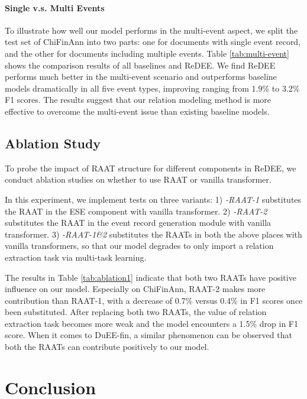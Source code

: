 \documentclass[11pt]{article}
\begin{document}
\paragraph{Single v.s. Multi Events} To illustrate how well our model performs in the multi-event aspect, we split the test set of ChiFinAnn into two parts: one for documents with single event record, and the other for documents including multiple events. Table \ref{tab:multi-event} shows the comparison results of all baselines and ReDEE. We find ReDEE performs much better in the multi-event scenario and outperforms baseline models dramatically in all five event types, improving ranging from 1.9\% to 3.2\% F1 scores. The results suggest that our relation modeling method is more effective to overcome the multi-event issue than existing baseline models.

\subsection{Ablation Study}

To probe the impact of RAAT structure for different components in ReDEE, we conduct ablation studies on whether to use RAAT or vanilla transformer.

In this experiment, we implement tests on three variants: 1) \textit{-RAAT-1}  substitutes the RAAT in the ESE component with vanilla transformer. 2) \textit{-RAAT-2} substitutes the RAAT in the event record generation module with vanilla transformer. 3) \textit{-RAAT-1\&2} substitutes the RAATs in both the above places with vanilla transformers, so that our model degrades to only import a relation extraction task via multi-task learning. 

The results in Table \ref{tab:ablation1} indicate that both two RAATs have positive influence on our model. Especially on ChiFinAnn, RAAT-2 makes more contribution than RAAT-1, with a decrease of 0.7\% versus 0.4\% in F1 scores once been substituted. After replacing both two RAATs, the value of relation extraction task becomes more weak and the model encounters a 1.5\% drop in F1 score. When it comes to DuEE-fin, a similar phenomenon can be observed that both the RAATs can contribute positively to our model.








\section{Conclusion}
\end{document}
